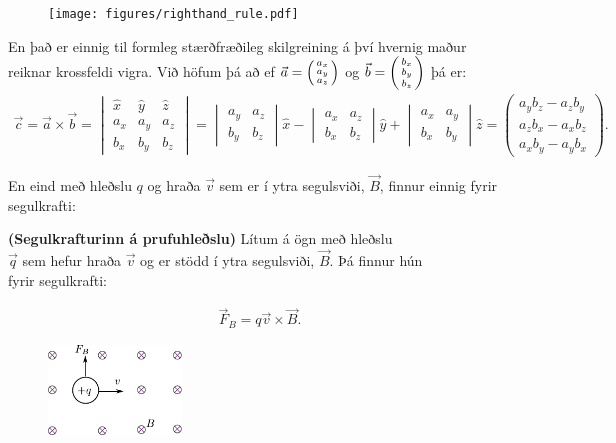 \begin{figure}[H]
    \centering
    \texttt{[image: figures/righthand\_rule.pdf]}
\end{figure}
En það er einnig til formleg stærðfræðileg skilgreining á því hvernig maður reiknar krossfeldi vigra. Við höfum þá að ef $\vec{a} = \smqty(a_x \\ a_y \\ a_z)$ og $\vec{b} = \smqty(b_x \\ b_y \\ b_z)$ þá er:
\begin{align*}
    \vec{c} = \vec{a} \times \vec{b} = \begin{vmatrix} \hat{x} & \hat{y} & \hat{z} \\ a_x & a_y & a_z  \\ b_x & b_y & b_z \end{vmatrix} = \begin{vmatrix} a_y & a_z \\ b_y & b_z \end{vmatrix} \hat{x} -\begin{vmatrix} a_x & a_z \\ b_x & b_z \end{vmatrix} \hat{y} + \begin{vmatrix} a_x & a_y \\ b_x & b_y \end{vmatrix} \hat{z}  = \begin{pmatrix} a_y b_z - a_z b_y \\ a_z b_x - a_x b_z \\ a_x b_y - a_y b_x \end{pmatrix}.
\end{align*}


En eind með hleðslu $q$ og hraða $\vec{v}$ sem er í ytra segulsviði, $\vec{B}$, finnur einnig fyrir segulkrafti:
\begin{tcolorbox}
\begin{theorem}
\textbf{(Segulkrafturinn á prufuhleðslu)} Lítum á ögn með hleðslu \\ $\vec{q}$ sem hefur hraða $\vec{v}$ og er stödd í ytra segulsviði, $\vec{B}$. Þá finnur hún \\ fyrir segulkrafti:

\begin{align*}
    \vec{F}_B = q\vec{v} \times \vec{B}.
\end{align*}
\begin{minipage}{\linewidth}

\begin{figure}
\vspace{-2.75cm}
\includegraphics[width = 1.4in]{figures/segulsvid1.pdf}
\end{figure}
\phantom{.}
\end{minipage}
\end{theorem}
\end{tcolorbox}

